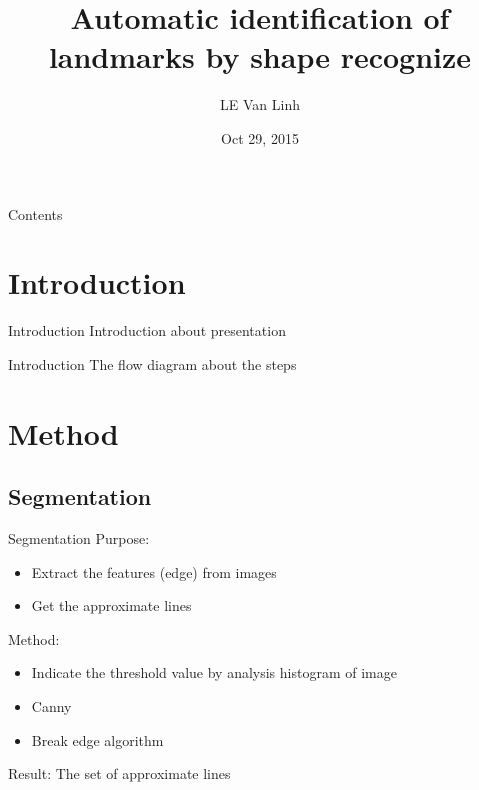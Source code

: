 \documentclass{beamer}
\title{Automatic identification of landmarks by shape recognize}
\author{LE Van Linh}
\date{Oct 29, 2015}
\begin{document}
\frame{\titlepage}
\begin{frame}{Contents}
	\tableofcontents
\end{frame}
\section{Introduction}
\begin{frame}{Introduction}
Introduction about presentation
\end{frame}
\begin{frame}{Introduction}
The flow diagram about the steps
\end{frame}
\section{Method}
\subsection{Segmentation}
\begin{frame}{Segmentation}
	Purpose: 
	\begin{itemize}
		\item Extract the features (edge) from images
		\item Get the approximate lines
	\end{itemize}
	Method:
	\begin{itemize}
		\item Indicate the threshold value by analysis histogram of image		
		\item Canny
		\item Break edge algorithm
	\end{itemize}
	Result: The set of approximate lines
\end{frame}
\end{document}
